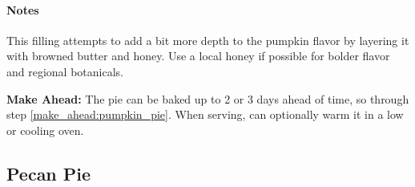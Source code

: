 \documentclass[12pt]{article}
\newenvironment*{ingredients}
	{
		\paragraph*{Ingredients}
		\begin{itemize}
	}
	{
		\end{itemize}
	}
\newenvironment*{directions}
	{
		\paragraph*{Directions}
		\begin{enumerate}
	}
	{
		\end{enumerate}
	}
\newenvironment*{notes}
	{
		\paragraph*{Notes}
		\begin{adjustwidth}{1cm}{}
	}
	{
		\end{adjustwidth}
	}
\begin{document}
	\begin{notes}
		This filling attempts to add a bit more depth to the pumpkin flavor by layering it with browned butter and honey. Use a local honey if possible for bolder flavor and regional botanicals.
		
		\textbf{Make Ahead:} The pie can be baked up to 2 or 3 days ahead of time, so through step \ref{make_ahead:pumpkin_pie}. When serving, can optionally warm it in a low or cooling oven.
	\end{notes}
	
	\newpage
	
	\subsection{Pecan Pie}
%	
%	
%	
\end{document}
